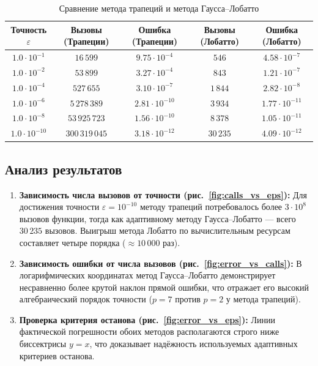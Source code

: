\documentclass[14pt]{extarticle}
\begin{document}
	\begin{table}[H]
		\centering
		\caption{Сравнение метода трапеций и метода Гаусса–Лобатто}
		\label{tab:results}
		\small
		\begin{tabular}{|c|c|c|c|c|}
			\hline
			\textbf{Точность} $\varepsilon$ & \textbf{Вызовы (Трапеции)} & \textbf{Ошибка (Трапеции)} & \textbf{Вызовы (Лобатто)} & \textbf{Ошибка (Лобатто)} \\
			\hline
			$1.0 \cdot 10^{-1}$  & $16\,599$        & $9.75 \cdot 10^{-4}$ & $546$    & $4.58 \cdot 10^{-7}$ \\
			$1.0 \cdot 10^{-2}$  & $53\,899$        & $3.27 \cdot 10^{-4}$ & $843$    & $1.21 \cdot 10^{-7}$ \\
			$1.0 \cdot 10^{-4}$  & $527\,655$       & $3.10 \cdot 10^{-7}$ & $1\,844$ & $2.82 \cdot 10^{-8}$ \\
			$1.0 \cdot 10^{-6}$  & $5\,278\,389$    & $2.81 \cdot 10^{-10}$ & $3\,934$ & $1.77 \cdot 10^{-11}$ \\
			$1.0 \cdot 10^{-8}$  & $53\,925\,723$   & $1.56 \cdot 10^{-10}$ & $8\,378$ & $1.05 \cdot 10^{-11}$ \\
			$1.0 \cdot 10^{-10}$ & $300\,319\,045$  & $3.18 \cdot 10^{-12}$ & $30\,235$ & $4.09 \cdot 10^{-12}$ \\
			\hline
		\end{tabular}
	\end{table}
	
	\subsection{Анализ результатов}
	
	\begin{enumerate}
		\item \textbf{Зависимость числа вызовов от точности (рис.~\ref{fig:calls_vs_eps}):}
		Для достижения точности $\varepsilon = 10^{-10}$ методу трапеций потребовалось более $3 \cdot 10^8$ вызовов функции, тогда как адаптивному методу Гаусса–Лобатто — всего $30\,235$ вызовов. Выигрыш метода Лобатто по вычислительным ресурсам составляет четыре порядка ($\approx 10\,000$ раз).
		
		\item \textbf{Зависимость ошибки от числа вызовов (рис.~\ref{fig:error_vs_calls}):}
		В логарифмических координатах метод Гаусса–Лобатто демонстрирует несравненно более крутой наклон прямой ошибки, что отражает его высокий алгебраический порядок точности ($p = 7$ против $p = 2$ у метода трапеций).
		
		\item \textbf{Проверка критерия останова (рис.~\ref{fig:error_vs_eps}):}
		Линии фактической погрешности обоих методов располагаются строго ниже биссектрисы $y = x$, что доказывает надёжность используемых адаптивных критериев останова.
	\end{enumerate}
	
\end{document}
